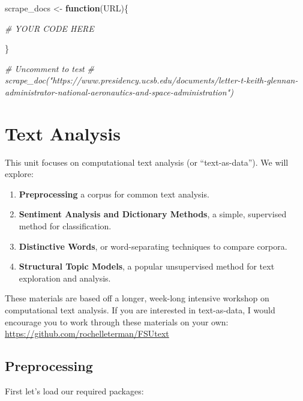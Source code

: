\documentclass[
]{book}
\newenvironment{Shaded}{\begin{snugshade}}{\end{snugshade}}
\newcommand{\CommentTok}[1]{\textcolor[rgb]{0.56,0.35,0.01}{\textit{#1}}}
\newcommand{\ControlFlowTok}[1]{\textcolor[rgb]{0.13,0.29,0.53}{\textbf{#1}}}
\newcommand{\KeywordTok}[1]{\textcolor[rgb]{0.13,0.29,0.53}{\textbf{#1}}}
\newcommand{\NormalTok}[1]{#1}
\newcommand{\StringTok}[1]{\textcolor[rgb]{0.31,0.60,0.02}{#1}}
\providecommand{\tightlist}{%
  \setlength{\itemsep}{0pt}\setlength{\parskip}{0pt}}
\begin{document}
\begin{Shaded}
\begin{Highlighting}[]
\NormalTok{scrape_docs <-}\StringTok{ }\ControlFlowTok{function}\NormalTok{(URL)\{}

  \CommentTok{# YOUR CODE HERE}
  
\NormalTok{\}}

\CommentTok{# Uncomment to test}
\CommentTok{# scrape_doc("https://www.presidency.ucsb.edu/documents/letter-t-keith-glennan-administrator-national-aeronautics-and-space-administration")}
\end{Highlighting}
\end{Shaded}

\hypertarget{text-analysis}{%
\chapter{Text Analysis}\label{text-analysis}}

This unit focuses on computational text analysis (or ``text-as-data''). We will explore:

\begin{enumerate}
\def\labelenumi{\arabic{enumi}.}
\tightlist
\item
  \textbf{Preprocessing} a corpus for common text analysis.
\item
  \textbf{Sentiment Analysis and Dictionary Methods}, a simple, supervised method for classification.
\item
  \textbf{Distinctive Words}, or word-separating techniques to compare corpora.
\item
  \textbf{Structural Topic Models}, a popular unsupervised method for text exploration and analysis.
\end{enumerate}

These materials are based off a longer, week-long intensive workshop on computational text analysis. If you are interested in text-as-data, I would encourage you to work through these materials on your own: \url{https://github.com/rochelleterman/FSUtext}

\hypertarget{preprocessing}{%
\section{Preprocessing}\label{preprocessing}}

First let's load our required packages:

\begin{Shaded}
\end{Shaded}
\end{document}
